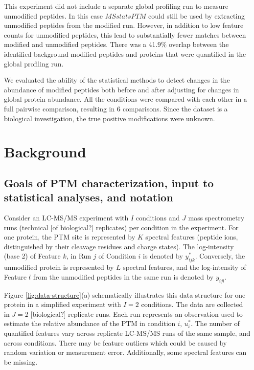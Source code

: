 \documentclass[mcp]{article}
\numberwithin{table}{section}
\def\todo#1{{\color{red}[#1]}}
\begin{document}
\medskip {} This experiment did not include a separate global profiling run to measure unmodified peptides. In this case $MSstatsPTM$ could still be used by extracting unmodified peptides from the modified run. However, in addition to low feature counts for unmodified peptides,  this lead to substantially fewer matches between modified and unmodified peptides. There was a 41.9\% overlap between the identified background modified peptides and proteins that were quantified in the global profiling run.

\medskip {} We evaluated the ability of the statistical methods to detect  changes in the abundance of modified peptides both before and after adjusting for changes in global protein abundance. All the conditions were compared with each other in a full pairwise comparison, resulting in 6 comparisons. Since the dataset is a biological investigation, the true positive modifications were unknown.

\section*{Background}

\subsection*{Goals of PTM characterization, input to statistical analyses, and notation}


Consider an LC-MS/MS experiment with $I$ conditions and $J$ mass spectrometry runs (technical \todo{of biological?} replicates) per condition in the experiment. For one protein, the PTM site is represented by $K$ spectral features (peptide ions, distinguished by their cleavage residues and charge states). The log-intensity (base 2) of Feature $k$, in Run $j$ of Condition $i$ is denoted by $y_{ijk}^{\ast}$. Conversely, the unmodified protein is represented by $L$ spectral features, and the log-intensity of Feature $l$ from the unmodified peptides in the same run is denoted by $y_{ijl}$. 

Figure \ref{fig:data-structure}(a) schematically illustrates this data structure for one protein in a simplified experiment with $I=2$ conditions. The data are collected in $J=2$ \todo{biological?} replicate runs. Each run represents an observation used to estimate the relative abundance of the PTM in condition $i$, $u_i^{\ast}$. The number of quantified features vary across replicate LC-MS/MS runs of the same sample, and across conditions. There may be feature outliers which could be caused by random variation or measurement error. Additionally, some spectral features can be missing. 
\end{document}

